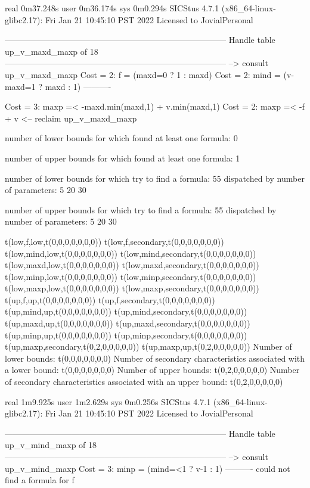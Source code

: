 real	0m37.248s
user	0m36.174s
sys	0m0.294s
SICStus 4.7.1 (x86_64-linux-glibc2.17): Fri Jan 21 10:45:10 PST 2022
Licensed to JovialPersonal


--------------------------------------------------------------------------------
Handle table up_v_maxd_maxp of 18
--------------------------------------------------------------------------------
--> consult up_v_maxd_maxp
Cost =  2:  f    = (maxd=0 ? 1 : maxd)
Cost =  2:  mind = (v-maxd=1 ? maxd : 1)
----------

Cost =  3:  maxp =< -maxd.min(maxd,1) + v.min(maxd,1)
Cost =  2:  maxp =< -f + v
<-- reclaim up_v_maxd_maxp

number of lower bounds for which found at least one formula: 0

number of upper bounds for which found at least one formula: 1

number of lower bounds for which try to find a formula: 55
dispatched by number of parameters: 5  20  30

number of upper bounds for which try to find a formula: 55
dispatched by number of parameters: 5  20  30

t(low,f,low,t(0,0,0,0,0,0,0))
t(low,f,secondary,t(0,0,0,0,0,0,0))
t(low,mind,low,t(0,0,0,0,0,0,0))
t(low,mind,secondary,t(0,0,0,0,0,0,0))
t(low,maxd,low,t(0,0,0,0,0,0,0))
t(low,maxd,secondary,t(0,0,0,0,0,0,0))
t(low,minp,low,t(0,0,0,0,0,0,0))
t(low,minp,secondary,t(0,0,0,0,0,0,0))
t(low,maxp,low,t(0,0,0,0,0,0,0))
t(low,maxp,secondary,t(0,0,0,0,0,0,0))
t(up,f,up,t(0,0,0,0,0,0,0))
t(up,f,secondary,t(0,0,0,0,0,0,0))
t(up,mind,up,t(0,0,0,0,0,0,0))
t(up,mind,secondary,t(0,0,0,0,0,0,0))
t(up,maxd,up,t(0,0,0,0,0,0,0))
t(up,maxd,secondary,t(0,0,0,0,0,0,0))
t(up,minp,up,t(0,0,0,0,0,0,0))
t(up,minp,secondary,t(0,0,0,0,0,0,0))
t(up,maxp,secondary,t(0,2,0,0,0,0,0))
t(up,maxp,up,t(0,2,0,0,0,0,0))
Number of lower bounds:                                             t(0,0,0,0,0,0,0)
Number of secondary characteristics associated with a lower bound:  t(0,0,0,0,0,0,0)
Number of upper bounds:                                             t(0,2,0,0,0,0,0)
Number of secondary characteristics associated with an upper bound: t(0,2,0,0,0,0,0)

real	1m9.925s
user	1m2.629s
sys	0m0.256s
SICStus 4.7.1 (x86_64-linux-glibc2.17): Fri Jan 21 10:45:10 PST 2022
Licensed to JovialPersonal


--------------------------------------------------------------------------------
Handle table up_v_mind_maxp of 18
--------------------------------------------------------------------------------
--> consult up_v_mind_maxp
Cost =  3:  minp = (mind=<1 ? v-1 : 1)
----------
could not find a formula for f

